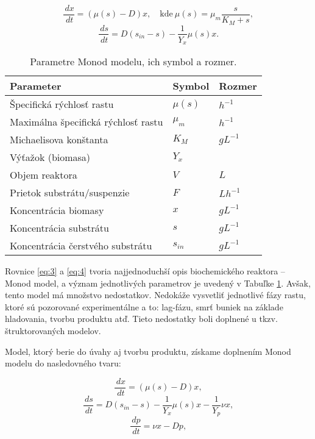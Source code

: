 \begin{equation} \label{eq:3}
	\frac{\,dx}{\,dt} = \left(\mu(s) - D\right)x, \quad \text{kde}  \ \mu(s) = \mu_{m}\frac{s}{K_{M} + s},
\end{equation}
\begin{equation} \label{eq:4}
	\frac{\,ds}{\,dt} = D\left(s_{in} - s\right) - \frac{1}{Y_{x}}\mu(s)x.
\end{equation}

\begin{table}[H]
	\centering
	\caption{Parametre Monod modelu, ich symbol a rozmer.}
	\label{tab: 2}
	\begin{tabular}{lll}
		\hline
		\textbf{Parameter} & \textbf{Symbol} & \textbf{Rozmer} \\
		\hline
		Špecifická rýchlosť rastu & $\mu(s)$ & $h^{-1}$ \\
		Maximálna špecifická rýchlosť rastu & $\mu_{m}$ & $h^{-1}$ \\
		Michaelisova konštanta & $K_{M}$ & $gL^{-1}$ \\
		Výťažok (biomasa) & $Y_{x}$ & \\
		Objem reaktora & $V$ & $L$ \\
		Prietok substrátu/suspenzie & $F$ & $Lh^{-1}$ \\
		Koncentrácia biomasy & $x$ & $gL^{-1}$ \\
		Koncentrácia substrátu & $s$ & $gL^{-1}$ \\
		Koncentrácia čerstvého substrátu & $s_{in}$ & $gL^{-1}$ \\
		\hline
	\end{tabular}
\end{table}

Rovnice \ref{eq:3} a \ref{eq:4} tvoria najjednoduchší opis biochemického reaktora -- Monod model, a význam jednotlivých parametrov je uvedený v Tabuľke \ref{tab: 2}. Avšak, tento model má množstvo nedostatkov. Nedokáže vysvetliť jednotlivé fázy rastu, ktoré sú pozorované experimentálne a to: lag-fázu, smrť buniek na základe hladovania, tvorbu produktu atď. Tieto nedostatky boli doplnené u tkzv. štruktorovaných modelov.

Model, ktorý berie do úvahy aj tvorbu produktu, získame doplnením Monod modelu do nasledovného tvaru: 

\begin{equation} \label{eq:5}
\frac{\,dx}{\,dt} = \left(\mu(s) - D\right)x,
\end{equation}
\begin{equation} \label{eq:6}
\frac{\,ds}{\,dt} = D\left(s_{in} - s\right) - \frac{1}{Y_{x}}\mu(s)x - \frac{1}{Y_{p}}\nu x,
\end{equation}
\begin{equation} \label{eq:7}
	\frac{\,dp}{\,dt} = \nu x - Dp,
\end{equation}


